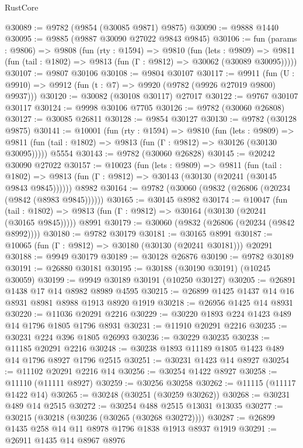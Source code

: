\begin{lexlean}{RustCore}
\begin{coremodule}
@30089 := @9782 (@9854 (@30085 @9871) @9875)
@30090 := @9888 @1440
@30095 := @9885 (@9887 @30090 @27022 @9843 @9845)
@30106 := fun (params : @9806) =>
  @9808
    (fun (rty : @1594) =>
    @9810
      (fun (lets : @9809) =>
      @9811 (fun (tail : @1802) => @9813 (fun (Γ : @9812) => @30062 (@30089 @30095)))))
@30107 := @9807 @30106
@30108 := @9804 @30107
@30117 := @9911
    (fun (U : @9910) => @9912 (fun (t : @7) => @9920 (@9782 (@9926 @27019 @9800) @9937)))
@30120 := @30082 (@30108 @30117) @27017
@30122 := @9767 @30107 @30117
@30124 := @9998 @30106 @7705
@30126 := @9782 (@30060 @26808)
@30127 := @30085 @26811
@30128 := @9854 @30127
@30130 := @9782 (@30128 @9875)
@30141 := @10001
    (fun (rty : @1594) =>
    @9810
      (fun (lets : @9809) =>
      @9811 (fun (tail : @1802) => @9813 (fun (Γ : @9812) => @30126 (@30130 @30095)))))
    @5554
@30143 := @9782 (@30060 @26828)
@30145 := @20242 @30090 @27022
@30157 := @10023
    (fun (lets : @9809) =>
    @9811
      (fun (tail : @1802) =>
      @9813 (fun (Γ : @9812) => @30143 (@30130 (@20241 (@30145 @9843 @9845))))))
    @8982
@30164 := @9782 (@30060 (@9832 (@26806 (@20234 (@9842 (@8983 @9845))))))
@30165 := @30145 @8982
@30174 := @10047
    (fun (tail : @1802) => @9813 (fun (Γ : @9812) => @30164 (@30130 (@20241 (@30165 @9845)))))
    @8991
@30179 := @30060 (@9832 (@26806 (@20234 (@9842 @8992))))
@30180 := @9782 @30179
@30181 := @30165 @8991
@30187 := @10065 (fun (Γ : @9812) => @30180 (@30130 (@20241 @30181))) @20291
@30188 := @9949 @30179
@30189 := @30128 @26876
@30190 := @9782 @30189
@30191 := @26880 @30181
@30195 := @30188 (@30190 @30191) (@10245 @30059)
@30199 := @9949 @30189 @30191 (@10250 @30127)
@30205 := @26891 @1438 @17 @14 @8982 @8989 @4595
@30215 := @26899 @1425 @1437 @14 @16 @8931 @8981 @8988 @1913 @8920 @1919
@30218 := @26956 @1425 @14 @8931
@30220 := @11036 @20291 @2216
@30229 := @30220 @1893 @224 @1423 @489 @14 @1796 @1805 @1796 @8931
@30231 := @11910 @20291 @2216
@30235 := @30231 @224 @396 @1805 @26993
@30236 := @30229 @30235
@30238 := @11185 @20291 @2216
@30248 := @30238 @1893 @11189 @1805 @1423 @489 @14 @1796 @8927 @1796 @2515
@30251 := @30231 @1423 @14 @8927
@30254 := @11102 @20291 @2216 @14
@30256 := @30254 @1422 @8927
@30258 := @11110 (@11111 @8927)
@30259 := @30256 @30258
@30262 := @11115 (@11117 @1422 @14)
@30265 := @30248 (@30251 (@30259 @30262))
@30268 := @30231 @489 @14 @2515
@30272 := @30254 @488 @2515 @13031 @13035
@30277 := @30215 (@30218 (@30236 (@30265 (@30268 @30272))))
@30287 := @26899 @1435 @258 @14 @11 @8978 @1796 @1838 @1913 @8937 @1919
@30291 := @26911 @1435 @14 @8967 @8976

\end{coremodule}
\end{lexlean}
